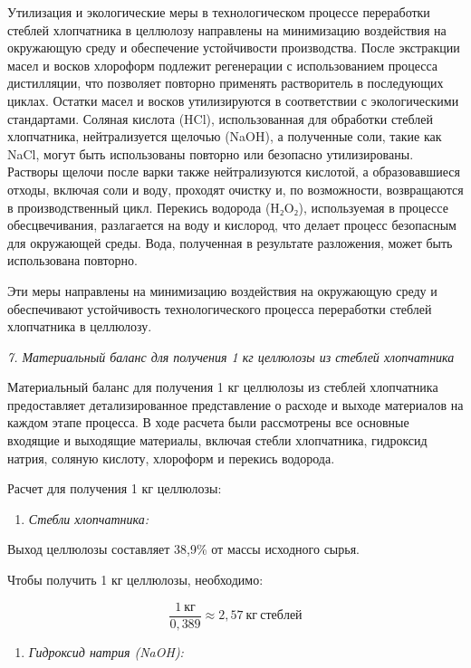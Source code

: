 Утилизация и экологические меры в технологическом процессе переработки
стеблей хлопчатника в целлюлозу направлены на минимизацию воздействия на
окружающую среду и обеспечение устойчивости производства. После
экстракции масел и восков хлороформ подлежит регенерации с
использованием процесса дистилляции, что позволяет повторно применять
растворитель в последующих циклах. Остатки масел и восков утилизируются
в соответствии с экологическими стандартами. Соляная кислота (HCl),
использованная для обработки стеблей хлопчатника, нейтрализуется щелочью
(NaOH), а полученные соли, такие как NaCl, могут быть использованы
повторно или безопасно утилизированы. Растворы щелочи после варки также
нейтрализуются кислотой, а образовавшиеся отходы, включая соли и воду,
проходят очистку и, по возможности, возвращаются в производственный
цикл. Перекись водорода (H₂O₂), используемая в процессе обесцвечивания,
разлагается на воду и кислород, что делает процесс безопасным для
окружающей среды. Вода, полученная в результате разложения, может быть
использована повторно.

Эти меры направлены на минимизацию воздействия на окружающую среду и
обеспечивают устойчивость технологического процесса переработки стеблей
хлопчатника в целлюлозу.

\emph{7. Материальный баланс для получения 1 кг целлюлозы из стеблей
хлопчатника}

Материальный баланс для получения 1 кг целлюлозы из стеблей хлопчатника
предоставляет детализированное представление о расходе и выходе
материалов на каждом этапе процесса. В ходе расчета были рассмотрены все
основные входящие и выходящие материалы, включая стебли хлопчатника,
гидроксид натрия, соляную кислоту, хлороформ и перекись водорода.

Расчет для получения 1 кг целлюлозы:

\begin{enumerate}
\def\labelenumi{\arabic{enumi}.}
\item
  \emph{Стебли хлопчатника:}
\end{enumerate}

Выход целлюлозы составляет 38,9\% от массы исходного сырья.

Чтобы получить 1 кг целлюлозы, необходимо:

\[\frac{1\ кг}{0,389} \approx 2,57\ кг\ стеблей\]

\begin{enumerate}
\def\labelenumi{\arabic{enumi}.}
\setcounter{enumi}{1}
\item
  \emph{Гидроксид натрия (NaOH):}
\end{enumerate}

